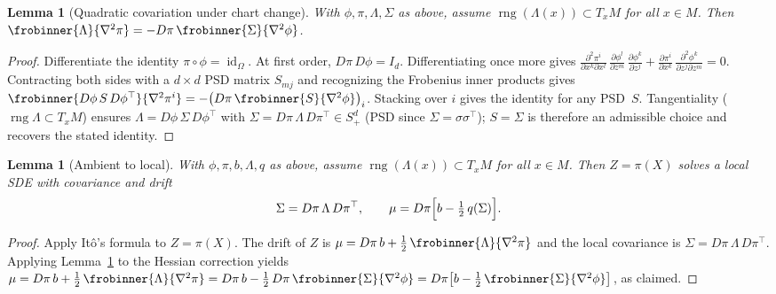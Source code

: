 \documentclass[11pt]{article}
\newcommand{\Om}{\Omega}
\newcommand{\rng}{\operatorname{rng}}
\newcommand{\id}{\operatorname{id}}
\newcommand{\pder}[2][]{\frac{\partial#1}{\partial#2}}
\newtheorem{lem}[thm]{Lemma}
\begin{document}
\begin{lem}[Quadratic covariation under chart change]\label{lem:qcov-change}
  With $\phi,\pi,\Lambda,\Sigma$ as above, assume
  $\rng(\Lambda(x))\subset T_xM$ for all $x\in M$.
  Then
  $\frobinner{\Lambda}{\nabla^2\pi}
    = -D\pi\,\frobinner{\Sigma}{\nabla^2\phi}$.
\end{lem}

\begin{proof}
  Differentiate the identity $\pi\circ\phi=\id_\Om$.
  At first order, $D\pi\,D\phi=I_d$.
  Differentiating once more gives
  $\pder[^2\pi^i]{x^k\partial x^l}\,
  \pder[\phi^l]{z^m}\,\pder[\phi^k]{z^j}
  + \pder[\pi^i]{x^k}\,\pder[^2\phi^k]{z^j\partial z^m} = 0$.
  Contracting both sides with a $d\times d$ PSD matrix $S_{mj}$
  and recognizing the Frobenius inner products gives
  $\frobinner{D\phi\,S\,D\phi^\top}{\nabla^2\pi^i}
  = -\bigl(D\pi\,\frobinner{S}{\nabla^2\phi}\bigr)_i$.
  Stacking over $i$ gives the identity for any PSD~$S$.
  Tangentiality ($\rng\Lambda\subset T_xM$) ensures
  $\Lambda=D\phi\,\Sigma\,D\phi^\top$ with
  $\Sigma=D\pi\,\Lambda\,D\pi^\top\in S_+^d$
  (PSD since $\Sigma=\sigma\sigma^\top$);
  $S=\Sigma$ is therefore an admissible choice and
  recovers the stated identity.
\end{proof}

\begin{lem}[Ambient to local]\label{lem:ambient-to-local}
  With $\phi,\pi,b,\Lambda,q$ as above, assume
  $\rng(\Lambda(x))\subset T_xM$ for all $x\in M$.
  Then $Z=\pi(X)$ solves a local SDE with
  covariance and drift 
  $$\Sigma = D\pi\,\Lambda\,D\pi^\top, \qquad \mu = D\pi\Bigl[b - \tfrac{1}{2}\,q(\Sigma)\Bigr].$$
\end{lem}

\begin{proof}
  Apply It\^o's formula to $Z=\pi(X)$.
  The drift of $Z$ is
  $\mu = D\pi\,b + \tfrac{1}{2}\,\frobinner{\Lambda}{\nabla^2\pi}$
  and the local covariance is
  $\Sigma = D\pi\,\Lambda\,D\pi^\top$.
  Applying Lemma~\ref{lem:qcov-change} to the Hessian correction
  yields
  $\mu = D\pi\,b + \tfrac{1}{2}\,\frobinner{\Lambda}{\nabla^2\pi}
       = D\pi\,b - \tfrac{1}{2}\,D\pi\,\frobinner{\Sigma}{\nabla^2\phi}
       = D\pi\bigl[b - \tfrac{1}{2}\,\frobinner{\Sigma}{\nabla^2\phi}\bigr]$,
  as claimed.
\end{proof}
\end{document}
